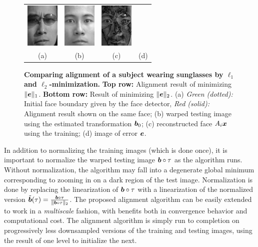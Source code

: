 \begin{figure}
{\begin{tabular}{cccc}
\includegraphics[height=\tempheight]{figures_pami/y_warp_L2} &
\includegraphics[height=\tempheight]{figures_pami/y_hat_L2} &
\includegraphics[height=\tempheight]{figures_pami/e_L2} \\
(a) & (b) & (c) & (d)
\end{tabular}}
\caption{\small{\bf Comparing alignment of a subject wearing sunglasses by
$\ell_1$ and $\ell_2$-minimization.}
{\bf Top row:} Alignment result of minimizing $\|\boldsymbol{e}\|_1$. {\bf Bottom row:}
Result of minimizing $\|\boldsymbol{e}\|_2$. (a) {\em Green (dotted):} Initial face boundary
given by the face detector, {\em Red (solid):} Alignment result shown on the same
face; (b) warped testing image using the estimated transformation $\boldsymbol{b}_0$;
(c) reconstructed face $A_i{\boldsymbol{x}}$ using the training; (d) image of error $\boldsymbol{e}$. }\label{fig:L1-L2-align}
\end{figure}

In addition to normalizing the training images (which is done
once), it is important to normalize the warped testing image
$\boldsymbol{b} \circ \tau$ as the algorithm runs.  Without normalization,
the algorithm may fall into a degenerate global minimum
corresponding to zooming in on a dark region of the test
image.  Normalization is done by replacing the linearization of
$\boldsymbol{b} \circ \tau$ with a linearization of the normalized version
$\tilde {\boldsymbol{b}}(\tau) = \frac{\boldsymbol{b} \circ \tau}{\|\boldsymbol{b} \circ \tau\|_2}$.
The proposed alignment algorithm can be easily extended to work
in a {\em multiscale} fashion, with benefits both in
convergence behavior and computational cost.  The alignment
algorithm is simply run to completion on progressively less
downsampled versions of the training and testing images, using
the result of one level to initialize the next.

